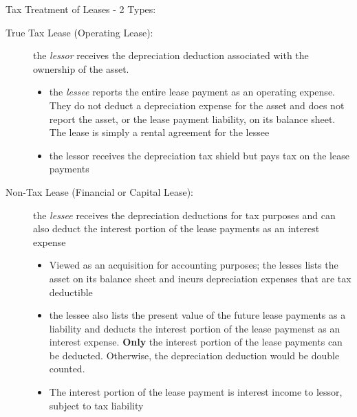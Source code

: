 \documentclass{report}
\begin{document}
Tax Treatment of Leases - 2 Types:
\begin{description}
\item[True Tax Lease (Operating Lease):] the \textit{lessor} receives the depreciation deduction associated with the ownership of the asset.
  \begin{itemize}
  \item the \textit{lessee} reports the entire lease payment as an operating expense. They do not deduct a depreciation expense for the asset and does not report the asset, or the lease payment liability, on its balance sheet. The lease is simply a rental agreement for the lessee
  \item the lessor receives the depreciation tax shield but pays tax on the lease payments
  \end{itemize}
\item[Non-Tax Lease (Financial or Capital Lease):] the \textit{lessee} receives the depreciation deductions for tax purposes and can also deduct the interest portion of the lease payments as an interest expense
  \begin{itemize}
  \item Viewed as an acquisition for accounting purposes; the lesses lists the asset on its balance sheet and incurs depreciation expenses that are tax deductible
  \item the lessee also lists the present value of the future lease payments as a liability and deducts the interest portion of the lease paymenst as an interest expense. \textbf{Only} the interest portion of the lease payments can be deducted. Otherwise, the depreciation deduction would be double counted.
  \item The interest portion of the lease payment is interest income to lessor, subject to tax liability
  \end{itemize}
\end{description}
\end{document}
